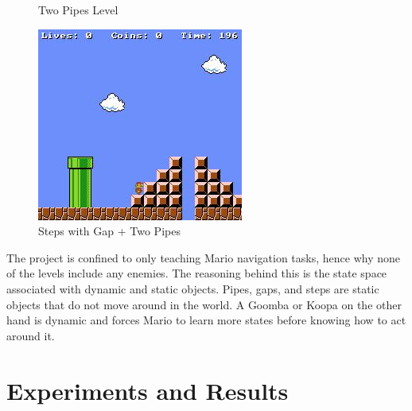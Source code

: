 \documentclass[notitlepage,a4paper,11pt]{article}
\begin{document}
\begin{figure}[!htb]
  \caption{Two Pipes Level}\label{fig:}
\endminipage\hfill
{}%
  \includegraphics[width=\linewidth]{figs/steps_pipe_level.png}
  \caption{Steps with Gap + Two Pipes}\label{fig:awesome_image3}
\endminipage
\end{figure}

The project is confined to only teaching Mario navigation tasks, hence why none of the levels include any enemies. The reasoning behind this is the state space associated with dynamic and static objects. Pipes, gaps, and steps are static objects that do not move around in the world. A Goomba or Koopa on the other hand is dynamic and forces Mario to learn more states before knowing how to act around it.

\section{Experiments and Results}
\end{document}
